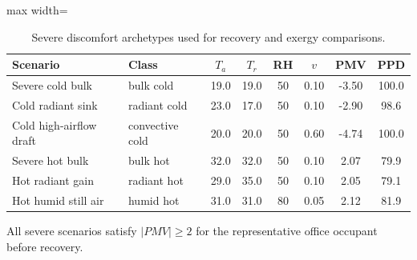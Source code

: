 \begin{table}[t]
\centering
\caption{Severe discomfort archetypes used for recovery and exergy comparisons.}
\label{tab:scenarios}
\begin{adjustbox}{max width=\textwidth}
\begin{tabular}{p{3.3cm}p{1.8cm}cccccc}
\toprule
Scenario & Class & $T_a$ & $T_r$ & RH & $v$ & PMV & PPD \\
\midrule
Severe cold bulk & bulk cold & 19.0 & 19.0 & 50 & 0.10 & -3.50 & 100.0 \\
Cold radiant sink & radiant cold & 23.0 & 17.0 & 50 & 0.10 & -2.90 & 98.6 \\
Cold high-airflow draft & convective cold & 20.0 & 20.0 & 50 & 0.60 & -4.74 & 100.0 \\
Severe hot bulk & bulk hot & 32.0 & 32.0 & 50 & 0.10 & 2.07 & 79.9 \\
Hot radiant gain & radiant hot & 29.0 & 35.0 & 50 & 0.10 & 2.05 & 79.1 \\
Hot humid still air & humid hot & 31.0 & 31.0 & 80 & 0.05 & 2.12 & 81.9 \\
\bottomrule
\end{tabular}
\end{adjustbox}
\begin{flushleft}\footnotesize All severe scenarios satisfy $|PMV| \geq 2$ for the representative office occupant before recovery.\end{flushleft}
\end{table}
